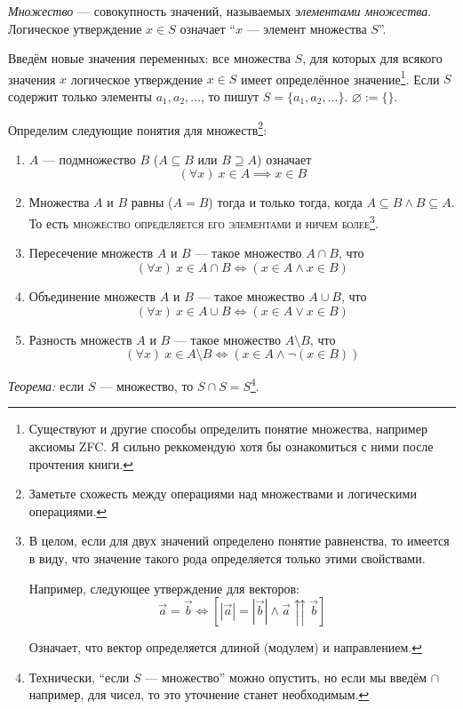 {\it Множество} --- совокупность значений, называемых {\it элементами множества}.
Логическое утверждение $x\in S$ означает ``$x$ --- элемент множества $S$''.

Введём новые значения переменных: все множества $S$, для которых для
всякого значения $x$ логическое утверждение ${x\in S}$ имеет определённое
значение\footnote{Существуют и другие способы определить
	понятие множества, например аксиомы ZFC. Я сильно реккомендую
	хотя бы ознакомиться с ними после прочтения книги.}.
Если $S$ содержит только элементы $a_1,a_2,...$, то пишут $S=\{a_1,a_2,...\}$.
$\varnothing:=\{\}$.

Определим следующие понятия для множеств\footnote{Заметьте схожесть между операциями
	над множествами и логическими операциями.}:
\begin{enumerate}
	\item{}$A$ --- подмножество $B$ (${A\subseteq B}$ или $B\supseteq A$) означает
	\[
		(\forall x)~x\in A\implies x\in B
	\]

	\item{}Множества $A$ и $B$ равны ($A=B$) тогда и только тогда, когда
	$A\subseteq B\land B\subseteq A$.
	То есть \textsc{множество определяется его элементами и ничем более}\footnote{
		В целом, если для двух значений определено понятие равненства,
		то имеется в виду, что значение такого рода определяется только этими
		свойствами.

		Например, следующее утверждение для векторов:
		\[
			\vec{a}=\vec{b}\iff\left[|\vec{a}|=|\vec{b}|\land
				\vec{a}\upuparrows\vec{b}\right]
		\]

		Означает, что вектор определяется длиной (модулем) и направлением.
	}.

	\item{}Пересечение множеств $A$ и $B$ --- такое множество $A\cap B$, что
	\[
		(\forall x)~x\in A\cap B\iff(x\in A\land x\in B)
	\]

	\item{}Объединение множеств $A$ и $B$ --- такое множество $A\cup B$, что
	\[
		(\forall x)~x\in A\cup B\iff (x\in A\lor x\in B)
	\]

	\item{}Разность множеств $A$ и $B$ --- такое множество $A\setminus B$, что
	\[
		(\forall x)~x\in A\setminus B\iff (x\in A\land \lnot(x\in B))
	\]
\end{enumerate}

{\it Теорема:} если $S$ --- множество, то $S\cap S=S$\footnote{
	Технически, ``если $S$ --- множество'' можно опустить, но если
	мы введём $\cap$ например, для чисел, то это уточнение станет необходимым.
}.

